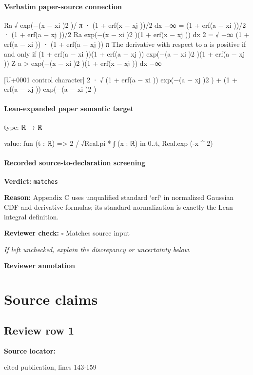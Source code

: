 \documentclass[10pt]{article}
\newcommand{\reviewerbox}{%
  \par\noindent\fbox{\parbox{0.96\linewidth}{\rule{0pt}{0.38in}}}\par
}
\newcommand{\reviewmatch}[1]{%
  \par\noindent\textbf{Reviewer check:} $\square$\; #1\par
  \noindent\emph{If left unchecked, explain the discrepancy or uncertainty below.}\par
}
\begin{document}
\paragraph{Verbatim paper-source connection}
\begin{ReviewVerbatim}
Ra
√
exp(−(x − xi )2 )/ π · (1 + erf(x − xj ))/2 dx
−∞
=
(1 + erf(a − xi ))/2 · (1 + erf(a − xj ))/2
Ra
exp(−(x − xi )2 )(1 + erf(x − xj )) dx
2
= √ −∞
(1 + erf(a − xi )) · (1 + erf(a − xj ))
π
The derivative with respect to a is positive if and only if
(1 + erf(a − xi ))(1 + erf(a − xj )) exp(−(a − xi )2 )(1 + erf(a − xj ))
Z a
>
exp(−(x − xi )2 )(1 + erf(x − xj )) dx
−∞

[U+0001 control character]
2
· √ (1 + erf(a − xi )) exp(−(a − xj )2 ) + (1 + erf(a − xj )) exp(−(a − xi )2 )
\end{ReviewVerbatim}



\paragraph{Lean-expanded paper semantic target}
\begin{ReviewVerbatim}
type:
ℝ → ℝ

value:
fun (t : ℝ) => 2 / √Real.pi * ∫ (x : ℝ) in 0..t, Real.exp (-x ^ 2)
\end{ReviewVerbatim}


\paragraph{Recorded source-to-declaration screening}
\textbf{Verdict:} \texttt{matches}
\\
{\raggedright
\textbf{Reason:} Appendix C uses unqualified standard `erf` in normalized Gaussian CDF and derivative formulas;\allowbreak{} its standard normalization is exactly the Lean integral definition.\allowbreak{}
\par}
\reviewmatch{Matches source input}
\noindent\textbf{Reviewer annotation}\par
\reviewerbox

\clearpage
\hypertarget{source-claim-413fc0a7e71398bc}{}
\hypertarget{source-section-f10b5f68e4acf3dc}{}
\section*{Source claims}
\subsection*{Review row 1}
\textbf{Source locator:} {\footnotesize\raggedright cited publication, lines 143-\allowbreak{}159\par}
\end{document}
